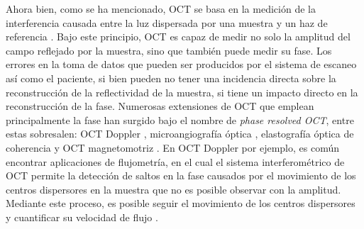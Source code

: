 
Ahora bien, como se ha mencionado, OCT se basa en la medición de la interferencia causada entre la luz dispersada por una muestra y un haz de referencia \cite{Huang1991}. Bajo este principio, OCT es capaz de medir no solo la amplitud del campo reflejado por la muestra, sino que también puede medir su fase. Los errores en la toma de datos que pueden ser producidos por el sistema de escaneo así como el paciente, si bien pueden no tener una incidencia directa sobre la reconstrucción de la reflectividad de la muestra, si tiene un impacto directo en la reconstrucción de la fase. Numerosas extensiones de OCT que emplean principalmente la fase han surgido bajo el nombre de \emph{phase resolved OCT}, entre estas sobresalen: OCT Doppler \cite{Chen1999}, microangiografía óptica \cite{Wang2010}, elastografía óptica de coherencia \cite{Ruikang2007} y OCT magnetomotriz \cite{Oldenburg2005}. En OCT Doppler por ejemplo, es común encontrar aplicaciones de flujometría, en el cual el sistema interferométrico de OCT permite la detección de saltos en la fase causados por el movimiento de los centros dispersores en la muestra que no es posible observar con la amplitud. Mediante este proceso, es posible seguir el movimiento de los centros dispersores y cuantificar su velocidad de flujo \cite{Chen1999}. 

